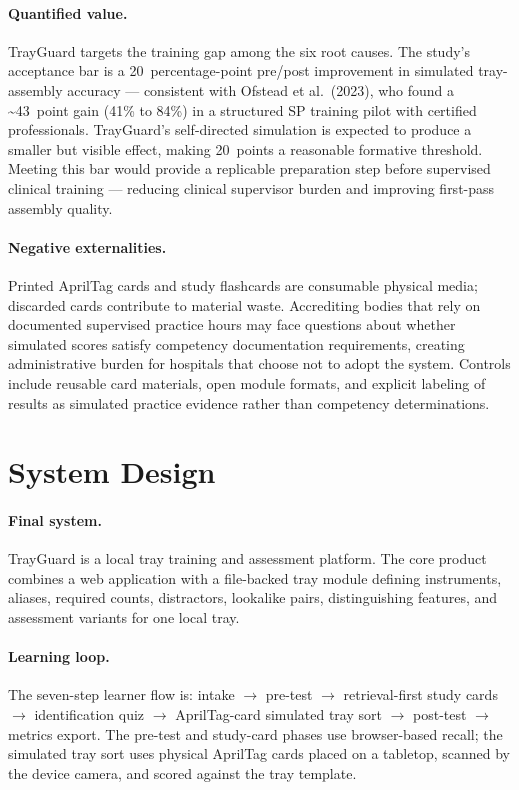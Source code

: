 \documentclass[10pt]{article}
\begin{document}
\paragraph{Quantified value.}
TrayGuard targets the training gap among the six root causes.
The study's acceptance bar is a 20~percentage-point pre/post improvement
in simulated tray-assembly accuracy --- consistent with Ofstead et al.~(2023),
who found a \~{}43~point gain (41\% to 84\%) in a structured SP training pilot
with certified professionals. TrayGuard's self-directed simulation is expected
to produce a smaller but visible effect, making 20~points a reasonable
formative threshold. Meeting this bar would provide a replicable preparation
step before supervised clinical training --- reducing clinical supervisor burden
and improving first-pass assembly quality.

\paragraph{Negative externalities.}
Printed AprilTag cards and study flashcards are consumable physical media;
discarded cards contribute to material waste. Accrediting bodies that rely on
documented supervised practice hours may face questions about whether simulated
scores satisfy competency documentation requirements, creating administrative
burden for hospitals that choose not to adopt the system. Controls include
reusable card materials, open module formats, and explicit labeling of results
as simulated practice evidence rather than competency determinations.

\section*{System Design}

\paragraph{Final system.}
TrayGuard is a local tray training and assessment platform. The core product
combines a web application with a file-backed tray module defining instruments,
aliases, required counts, distractors, lookalike pairs, distinguishing
features, and assessment variants for one local tray.

\paragraph{Learning loop.}
The seven-step learner flow is: intake $\rightarrow$ pre-test $\rightarrow$
retrieval-first study cards $\rightarrow$ identification quiz $\rightarrow$
AprilTag-card simulated tray sort $\rightarrow$ post-test $\rightarrow$ metrics
export. The pre-test and study-card phases use browser-based recall; the
simulated tray sort uses physical AprilTag cards placed on a tabletop, scanned
by the device camera, and scored against the tray template.
\end{document}
